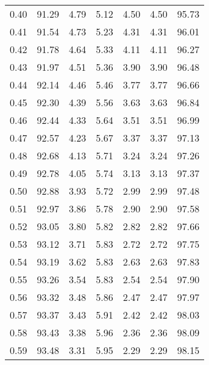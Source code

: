 \begin{tabular}{|c|c|c|c|c|c|c|}
      0.40 &     91.29 &      4.79 &       5.12 &    4.50 &       4.50 &         95.73 \\
      0.41 &     91.54 &      4.73 &       5.23 &    4.31 &       4.31 &         96.01 \\
      0.42 &     91.78 &      4.64 &       5.33 &    4.11 &       4.11 &         96.27 \\
      0.43 &     91.97 &      4.51 &       5.36 &    3.90 &       3.90 &         96.48 \\
      0.44 &     92.14 &      4.46 &       5.46 &    3.77 &       3.77 &         96.66 \\
      0.45 &     92.30 &      4.39 &       5.56 &    3.63 &       3.63 &         96.84 \\
      0.46 &     92.44 &      4.33 &       5.64 &    3.51 &       3.51 &         96.99 \\
      0.47 &     92.57 &      4.23 &       5.67 &    3.37 &       3.37 &         97.13 \\
      0.48 &     92.68 &      4.13 &       5.71 &    3.24 &       3.24 &         97.26 \\
      0.49 &     92.78 &      4.05 &       5.74 &    3.13 &       3.13 &         97.37 \\
      0.50 &     92.88 &      3.93 &       5.72 &    2.99 &       2.99 &         97.48 \\
      0.51 &     92.97 &      3.86 &       5.78 &    2.90 &       2.90 &         97.58 \\
      0.52 &     93.05 &      3.80 &       5.82 &    2.82 &       2.82 &         97.66 \\
      0.53 &     93.12 &      3.71 &       5.83 &    2.72 &       2.72 &         97.75 \\
      0.54 &     93.19 &      3.62 &       5.83 &    2.63 &       2.63 &         97.83 \\
      0.55 &     93.26 &      3.54 &       5.83 &    2.54 &       2.54 &         97.90 \\
      0.56 &     93.32 &      3.48 &       5.86 &    2.47 &       2.47 &         97.97 \\
      0.57 &     93.37 &      3.43 &       5.91 &    2.42 &       2.42 &         98.03 \\
      0.58 &     93.43 &      3.38 &       5.96 &    2.36 &       2.36 &         98.09 \\
      0.59 &     93.48 &      3.31 &       5.95 &    2.29 &       2.29 &         98.15 \\

\end{tabular}
